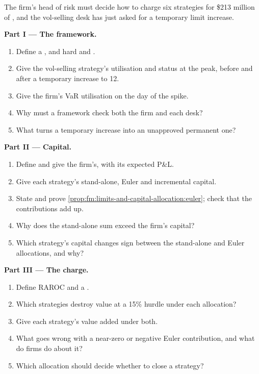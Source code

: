 \begin{problem}\label{pb:fm:limits-and-capital-allocation:1}
The firm's head of risk must decide how to charge six strategies for \$213 million of , and the vol-selling desk has just asked for
a temporary limit increase.

\medskip\noindent\textbf{Part I --- The framework.}
\begin{enumerate}
\item Define a , and hard and .
\item Give the vol-selling strategy's utilisation and status at the peak, before and after a temporary increase to 12.
\item Give the firm's VaR utilisation on the day of the spike.
\item Why must a framework check both the firm and each desk?
\item What turns a temporary increase into an unapproved permanent one?
\end{enumerate}

\medskip\noindent\textbf{Part II --- Capital.}
\begin{enumerate}[resume]
\item Define  and give the firm's, with its expected P\&L.
\item Give each strategy's stand-alone, Euler and incremental capital.
\item State and prove \cref{prop:fm:limits-and-capital-allocation:euler}; check that the contributions add up.
\item Why does the stand-alone sum exceed the firm's capital?
\item Which strategy's capital changes sign between the stand-alone and Euler allocations, and why?
\end{enumerate}

\medskip\noindent\textbf{Part III --- The charge.}
\begin{enumerate}[resume]
\item Define RAROC and a .
\item Which strategies destroy value at a 15\% hurdle under each allocation?
\item Give each strategy's value added under both.
\item What goes wrong with a near-zero or negative Euler contribution, and what do firms do about it?
\item Which allocation should decide whether to close a strategy?
\end{enumerate}


\end{problem}
